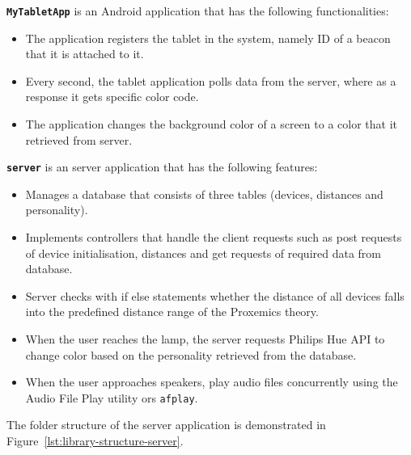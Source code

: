 \textbf{\texttt{MyTabletApp}} is an Android application that has the following functionalities:
\begin{itemize}
    \item The application registers the tablet in the system, namely ID of a beacon that it is attached to it.
    \item Every second, the tablet application polls data from the server, where as a response it gets specific color code.
    \item The application changes the background color of a screen to a color that it retrieved from server.
\end{itemize}

\textbf{\texttt{server}} is an server application that has the following features:
\begin{itemize}
    \item Manages a database that consists of three tables (devices, distances and personality).
    \item Implements controllers that handle the client requests such as post requests of device initialisation,
    distances and get requests of required data from database.
    \item Server checks with if else statements whether the distance of all devices falls into the predefined distance range of the Proxemics theory.
    \item When the user reaches the lamp, the server requests Philips Hue API to change color based on the personality retrieved from the database.
    \item When the user approaches speakers, play audio files concurrently using the Audio File Play
    utility ors \texttt{afplay}.
\end{itemize}

The folder structure of the server application is demonstrated in Figure~\ref{lst:library-structure-server}.


